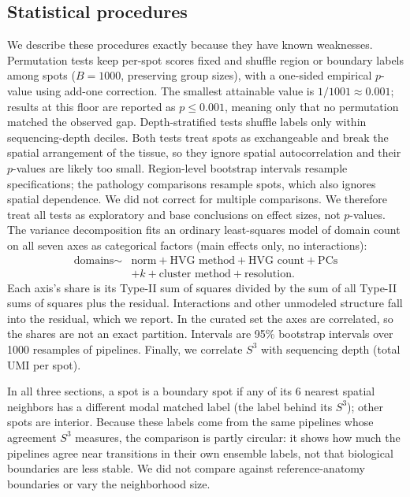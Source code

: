 \documentclass[conference]{IEEEtran}
\begin{document}
\subsection{Statistical procedures}
\label{sec:stats}
We describe these procedures exactly because they have known weaknesses.
Permutation tests keep per-spot scores fixed and shuffle region or
boundary labels among spots ($B{=}1000$, preserving group sizes), with a
one-sided empirical $p$-value using add-one correction. The smallest
attainable value is $1/1001\approx0.001$; results at this floor are
reported as $p\le0.001$, meaning only that no permutation matched the
observed gap.
Depth-stratified tests shuffle labels only within
sequencing-depth deciles. Both tests treat spots as exchangeable and break
the spatial arrangement of the tissue, so they ignore spatial
autocorrelation and their $p$-values are likely too small. Region-level
bootstrap intervals resample specifications; the pathology
comparisons resample spots, which also ignores spatial dependence. We did
not correct for multiple comparisons. We therefore treat all tests as
exploratory and base conclusions on effect sizes, not $p$-values.
The variance decomposition fits an ordinary least-squares model of
domain count on all seven axes as categorical factors (main effects only,
no interactions):
\begin{align*}
  \text{domains} \sim{}& \text{norm} + \text{HVG method} + \text{HVG count}
  + \text{PCs}\\
  &+ k + \text{cluster method} + \text{resolution}.
\end{align*}
Each axis's share is its Type-II sum of squares divided by the sum of all
Type-II sums of squares plus the residual. Interactions and other unmodeled
structure fall into the residual, which we report. In the curated set the
axes are correlated, so the shares are not an exact partition. Intervals
are 95\% bootstrap intervals over 1000 resamples of pipelines.
Finally,
we correlate $S^3$ with sequencing depth (total UMI per spot).

In all three sections, a spot is a boundary
spot if any of its 6 nearest spatial neighbors has a different modal
matched label (the label behind its $S^3$); other spots are interior.
Because these labels come from the same pipelines whose agreement $S^3$
measures, the comparison is partly circular: it shows how much the
pipelines agree near transitions in their own ensemble labels, not that
biological boundaries are less stable. We did not compare against
reference-anatomy boundaries or vary the neighborhood size.
\end{document}
